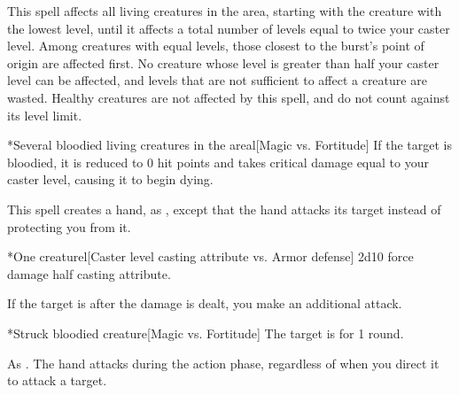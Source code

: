 \spellline
\spelleffect This spell affects all \bloodied living creatures in the area, starting with the creature with the lowest level, until it affects a total number of levels equal to twice your caster level. Among creatures with equal levels, those closest to the burst's point of origin are affected first. No creature whose level is greater than half your caster level can be affected, and levels that are not sufficient to affect a creature are wasted. Healthy creatures are not affected by this spell, and do not count against its level limit.
\begin{spelltargets}*{Several bloodied living creatures in the area}l[Magic vs. Fortitude]
    \spellsuccess If the target is bloodied, it is reduced to 0 hit points and takes critical damage equal to your caster level, causing it to begin dying.
\end{spelltargets}
\spellline
{}

\spellrng{\rngmed}
\spelldur{\durshort \dismissable}
\spellline
\spelleffect This spell creates a hand, as , except that the hand attacks its target instead of protecting you from it.
\begin{spelltarget}*{One creature}l[Caster level \add casting attribute vs. Armor defense]
    \spellsuccess 2d10 force damage \add half casting attribute.

    If the target is \bloodied after the damage is dealt, you make an additional attack.
    \begin{spelltarget}*{Struck bloodied creature}[Magic vs. Fortitude]
        \spellsuccess The target is \dazed for 1 round.
    \end{spelltarget}
\end{spelltarget}
\spellnotes As . The hand attacks during the action phase, regardless of when you direct it to attack a target.

